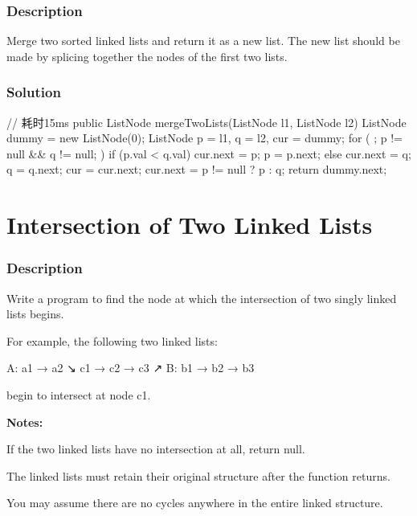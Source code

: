 \subsubsection{Description}
Merge two sorted linked lists and return it as a new list. The new list should be made by splicing together the nodes of the first two lists.

\subsubsection{Solution}

\begin{Code}
// 耗时15ms
public ListNode mergeTwoLists(ListNode l1, ListNode l2) {
    ListNode dummy = new ListNode(0);
    ListNode p = l1, q = l2, cur = dummy;
    for ( ; p != null && q != null; ) {
        if (p.val < q.val) {
            cur.next = p;
            p = p.next;
        } else {
            cur.next = q;
            q = q.next;
        }
        cur = cur.next;
    }
    cur.next = p != null ? p : q;
    return dummy.next;
}
\end{Code}

\newpage

\section{Intersection of Two Linked Lists} %

\subsubsection{Description}
Write a program to find the node at which the intersection of two singly linked lists begins.

For example, the following two linked lists:
\begin{Code}
A:          a1 → a2
                   ↘
                     c1 → c2 → c3
                   ↗
B:     b1 → b2 → b3
\end{Code}

begin to intersect at node c1.


\textbf{Notes:}

If the two linked lists have no intersection at all, return null.

The linked lists must retain their original structure after the function returns.

You may assume there are no cycles anywhere in the entire linked structure.

